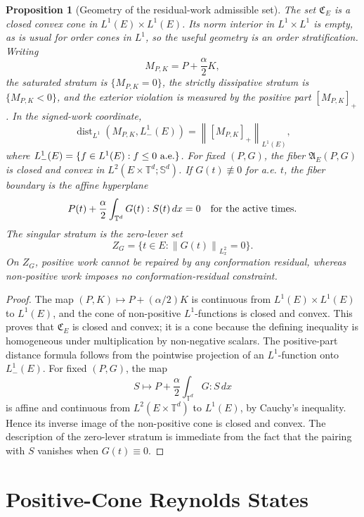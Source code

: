 \documentclass[11pt]{article}
\numberwithin{equation}{section}
\newtheorem{proposition}[theorem]{Proposition}
\newcommand{\T}{\mathbb T}
\newcommand{\Sym}{\mathbb S}
\newcommand{\norm}[1]{\left\lVert #1\right\rVert}
\begin{document}
\begin{proposition}[Geometry of the residual-work admissible set]
\label{prop:residual-cone-geometry}
The set \(\mathfrak C_E\) is a closed convex cone in
\(L^1(E)\times L^1(E)\).  Its norm interior in \(L^1\times L^1\) is empty, as
is usual for order cones in \(L^1\), so the useful geometry is an order
stratification.  Writing
\[
  M_{P,K}=P+\frac{\alpha}{2}K,
\]
the saturated stratum is \(\{M_{P,K}=0\}\), the strictly dissipative stratum is
\(\{M_{P,K}<0\}\), and the exterior violation is measured by the positive part
\([M_{P,K}]_+\).  In the signed-work coordinate,
\[
  \operatorname{dist}_{L^1}(M_{P,K},L^1_-(E))
  =
  \norm{[M_{P,K}]_+}_{L^1(E)},
\]
where \(L^1_-(E)=\{f\in L^1(E):f\le0\hbox{ a.e.}\}\).  For fixed \((P,G)\),
the fiber \(\mathfrak A_E(P,G)\) is closed and convex in
\(L^2(E\times\T^d;\Sym^d)\).
If \(G(t)\not\equiv0\) for a.e. \(t\), the fiber boundary is the affine
hyperplane
\[
  P(t)+\frac{\alpha}{2}\int_{\T^d}G(t):S(t)\,dx=0
  \quad\hbox{for the active times}.
\]
The singular stratum is the zero-lever set
\[
  Z_G=\{t\in E:\norm{G(t)}_{L^2_x}=0\}.
\]
On \(Z_G\), positive work cannot be repaired by any conformation residual,
whereas non-positive work imposes no conformation-residual constraint.
\end{proposition}

\begin{proof}
The map \((P,K)\mapsto P+(\alpha/2)K\) is continuous from
\(L^1(E)\times L^1(E)\) to \(L^1(E)\), and the cone of non-positive
\(L^1\)-functions is closed and convex.  This proves that
\(\mathfrak C_E\) is closed and convex; it is a cone because the defining
inequality is homogeneous under multiplication by non-negative scalars.  The
positive-part distance formula follows from the pointwise projection of an
\(L^1\)-function onto \(L^1_-(E)\).  For fixed \((P,G)\), the map
\[
  S\mapsto P+\frac{\alpha}{2}\int_{\T^d}G:S\,dx
\]
is affine and continuous from \(L^2(E\times\T^d)\) to \(L^1(E)\), by Cauchy's
inequality.  Hence its inverse image of the non-positive cone is closed and
convex.  The description of the zero-lever stratum is immediate from the fact
that the pairing with \(S\) vanishes when \(G(t)\equiv0\).
\end{proof}

\section{Positive-Cone Reynolds States}
\label{sec:states}
\end{document}
